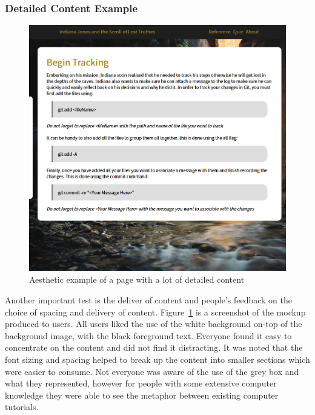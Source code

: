 \subsubsection{Detailed Content Example}
\begin{figure}[H]
	\centering
	\includegraphics[width=0.8\linewidth]{examplepage}
	\caption{Aesthetic example of a page with a lot of detailed content}\label{fig:content}
\end{figure}
Another important test is the deliver of content and people's feedback on the choice of spacing and delivery of content. Figure~\ref{fig:content} is a screenshot of the mockup produced to users. All users liked the use of the white background on-top of the background image, with the black foreground text. Everyone found it easy to concentrate on the content and did not find it distracting. It was noted that the font sizing and spacing helped to break up the content into smaller sections which were easier to consume. Not everyone was aware of the use of the grey box and what they represented, however for people with some extensive computer knowledge they were able to see the metaphor between existing computer tutorials.

